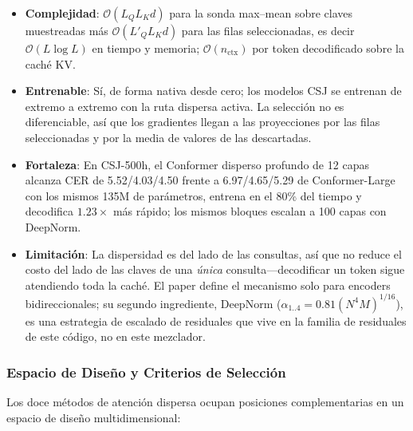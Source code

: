 \begin{itemize}[leftmargin=*]
    \item \textbf{Complejidad}: $\mathcal{O}(L_Q L_K d)$ para la sonda max--mean sobre claves muestreadas más $\mathcal{O}(L'_Q L_K d)$ para las filas seleccionadas, es decir $\mathcal{O}(L\log L)$ en tiempo y memoria; $\mathcal{O}(n_{\text{ctx}})$ por token decodificado sobre la caché KV.
    \item \textbf{Entrenable}: Sí, de forma nativa desde cero; los modelos CSJ se entrenan de extremo a extremo con la ruta dispersa activa. La selección no es diferenciable, así que los gradientes llegan a las proyecciones por las filas seleccionadas y por la media de valores de las descartadas.
    \item \textbf{Fortaleza}: En CSJ-500h, el Conformer disperso profundo de 12 capas alcanza CER de 5.52/4.03/4.50 frente a 6.97/4.65/5.29 de Conformer-Large con los mismos 135M de parámetros, entrena en el 80\% del tiempo y decodifica $1.23\times$ más rápido; los mismos bloques escalan a 100 capas con DeepNorm.
    \item \textbf{Limitación}: La dispersidad es del lado de las consultas, así que no reduce el costo del lado de las claves de una \emph{única} consulta---decodificar un token sigue atendiendo toda la caché. El paper define el mecanismo solo para encoders bidireccionales; su segundo ingrediente, DeepNorm ($\alpha_{1..4}=0.81(N^4M)^{1/16}$), es una estrategia de escalado de residuales que vive en la familia de residuales de este código, no en este mezclador.
\end{itemize}

\subsubsection{Espacio de Diseño y Criterios de Selección}

Los doce métodos de atención dispersa ocupan posiciones complementarias en un espacio de diseño multidimensional:

